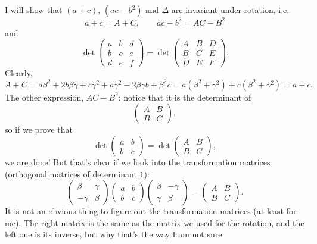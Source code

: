 I will show that $(a+c)$, $(ac-b^2)$ and $\Delta$ are invariant under rotation, i.e.
\[
a + c = A + C, \qquad ac - b^2 = AC - B^2
\]
and
\[
\det \begin{pmatrix} a & b & d \\ b & c & e \\ d & e & f \end{pmatrix}
= \det \begin{pmatrix} A & B & D \\ B & C & E \\ D & E & F \end{pmatrix}.
\]
Clearly,
\[
A + C = a\beta^2 + 2b\beta\gamma + c\gamma^2 + a\gamma^2 - 2\beta\gamma b + \beta^2 c = a(\beta^2 + \gamma^2) + c(\beta^2 + \gamma^2) = a + c .
\]
The other expression, $AC - B^2$: notice that it is the determinant of
\[
\begin{pmatrix} A & B \\ B & C \end{pmatrix},
\]
so if we prove that
\[
\det \begin{pmatrix} a & b \\ b & c \end{pmatrix} = \det \begin{pmatrix} A & B \\ B & C \end{pmatrix},
\]
we are done! But that's clear if we look into the transformation matrices (orthogonal matrices of determinant $1$):
\[
\begin{pmatrix} \beta & \gamma \\ -\gamma & \beta \end{pmatrix}
\begin{pmatrix} a & b \\ b & c \end{pmatrix}
\begin{pmatrix} \beta & -\gamma \\ \gamma & \beta \end{pmatrix}
= \begin{pmatrix} A & B \\ B & C \end{pmatrix}.
\]
It is not an obvious thing to figure out the transformation matrices (at least for me). The right matrix is the same as the matrix we used for the rotation, and the left one is its inverse, but why that's the way I am not sure.

